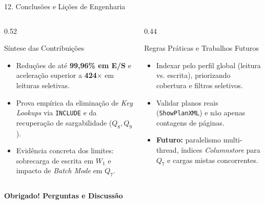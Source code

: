 \documentclass[aspectratio=169,11pt]{beamer}
\begin{document}
\begin{frame}{12. Conclusões e Lições de Engenharia}
  \begin{columns}[T]
    \begin{column}{0.52\textwidth}
      \begin{exampleblock}{Síntese das Contribuições}
        \begin{itemize}
          \item Reduções de até \textbf{99,96\% em E/S} e aceleração superior a \textbf{424$\times$} em leituras seletivas.
          \item Prova empírica da eliminação de \textit{Key Lookups} via \texttt{INCLUDE} e da recuperação de sargabilidade ($Q_8, Q_9$).
          \item Evidência concreta dos limites: sobrecarga de escrita em $W_1$ e impacto de \textit{Batch Mode} em $Q_7$.
        \end{itemize}
      \end{exampleblock}
    \end{column}
    \begin{column}{0.44\textwidth}
      \begin{block}{Regras Práticas e Trabalhos Futuros}
        \begin{itemize}
          \item Indexar pelo perfil global (leitura vs. escrita), priorizando cobertura e filtros seletivos.
          \item Validar planos reais (\texttt{ShowPlanXML}) e não apenas contagens de páginas.
          \item \textbf{Futuro:} paralelismo multi-thread, índices \textit{Columnstore} para $Q_7$ e cargas mistas concorrentes.
        \end{itemize}
      \end{block}
    \end{column}
  \end{columns}
  \vspace{0.4em}
  \centering
  \textbf{Obrigado! Perguntas e Discussão}
\end{frame}
\end{document}
